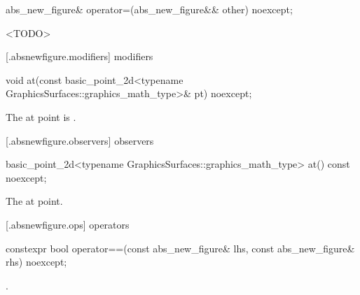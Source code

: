 %
\begin{itemdecl}
abs_new_figure& operator=(abs_new_figure&& other) noexcept;
\end{itemdecl}
\begin{itemdescr}
\pnum
\effects
<TODO>

\pnum
\returns
{}
\end{itemdescr}

 [\iotwod.absnewfigure.modifiers]{ modifiers}%

%
\begin{itemdecl}
void at(const basic_point_2d<typename GraphicsSurfaces::graphics_math_type>& pt) noexcept;
\end{itemdecl}
\begin{itemdescr}
\pnum
\effects
The at point is .
\end{itemdescr}

 [\iotwod.absnewfigure.observers]{ observers}%

%
\begin{itemdecl}
basic_point_2d<typename GraphicsSurfaces::graphics_math_type> at() const noexcept;
\end{itemdecl}
\begin{itemdescr}
\pnum
\returns
The at point.
\end{itemdescr}

 [\iotwod.absnewfigure.ops]{ operators}%

%
\begin{itemdecl}
constexpr bool operator==(const abs_new_figure& lhs, const abs_new_figure& rhs) noexcept;
\end{itemdecl}
\begin{itemdescr}
\pnum
\returns
{}.
\end{itemdescr}
